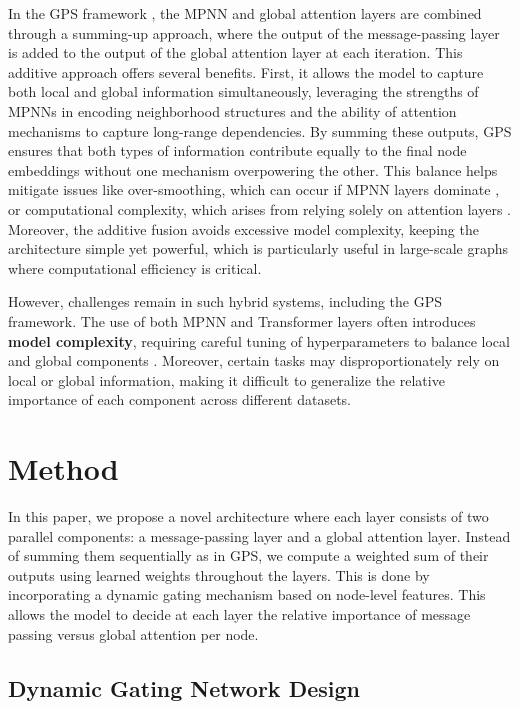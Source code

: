 \documentclass{acmart}
\begin{document}
In the GPS framework \cite{rampasek2022gps}, the MPNN and global attention layers are combined through a summing-up approach, where the output of the message-passing layer is added to the output of the global attention layer at each iteration. This additive approach offers several benefits. First, it allows the model to capture both local and global information simultaneously, leveraging the strengths of MPNNs in encoding neighborhood structures and the ability of attention mechanisms to capture long-range dependencies. By summing these outputs, GPS ensures that both types of information contribute equally to the final node embeddings without one mechanism overpowering the other. This balance helps mitigate issues like over-smoothing, which can occur if MPNN layers dominate \cite{oono2020expressive}, or computational complexity, which arises from relying solely on attention layers \cite{vaswani2017attention}. Moreover, the additive fusion avoids excessive model complexity, keeping the architecture simple yet powerful, which is particularly useful in large-scale graphs where computational efficiency is critical.

However, challenges remain in such hybrid systems, including the GPS framework. The use of both MPNN and Transformer layers often introduces \textbf{model complexity}, requiring careful tuning of hyperparameters to balance local and global components \cite{rampasek2022gps}. Moreover, certain tasks may disproportionately rely on local or global information, making it difficult to generalize the relative importance of each component across different datasets.

\section{Method}

In this paper, we propose a novel architecture where each layer consists of two parallel components: a message-passing layer and a global attention layer. Instead of summing them sequentially as in GPS, we compute a weighted sum of their outputs using learned weights throughout the layers. This is done by incorporating a dynamic gating mechanism based on node-level features. This allows the model to decide at each layer the relative importance of message passing versus global attention per node.

\subsection{Dynamic Gating Network Design}
\end{document}
